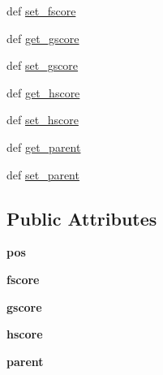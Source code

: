 \begin{DoxyCompactItemize}
\item 
def \hyperlink{classoctile__grid_1_1_octile_cell_ac76f218888c991ff5fa81ed0b4da3e01}{set\+\_\+fscore}
\item 
def \hyperlink{classoctile__grid_1_1_octile_cell_abae0db48969d455bf495159da0e2c28a}{get\+\_\+gscore}
\item 
def \hyperlink{classoctile__grid_1_1_octile_cell_a72832242286a038bda0d9fa5bdc0a3d8}{set\+\_\+gscore}
\item 
def \hyperlink{classoctile__grid_1_1_octile_cell_a80ff6a1f7058b02ffd8fa40ec55f411e}{get\+\_\+hscore}
\item 
def \hyperlink{classoctile__grid_1_1_octile_cell_a4824cc16039f8ea51496c5d844febd19}{set\+\_\+hscore}
\item 
def \hyperlink{classoctile__grid_1_1_octile_cell_a8c65a85d4226c3633698641225f5ff9e}{get\+\_\+parent}
\item 
def \hyperlink{classoctile__grid_1_1_octile_cell_a8839b31e60ae860413d607c37f4f7da4}{set\+\_\+parent}
\end{DoxyCompactItemize}
\subsection*{Public Attributes}
\begin{DoxyCompactItemize}
\item 
\hypertarget{classoctile__grid_1_1_octile_cell_a57d3eecddad6b6859b4670ed2bf60ee8}{}{\bfseries pos}\label{classoctile__grid_1_1_octile_cell_a57d3eecddad6b6859b4670ed2bf60ee8}

\item 
\hypertarget{classoctile__grid_1_1_octile_cell_a7f3b3b23d64645239d2e70bc83f401d2}{}{\bfseries fscore}\label{classoctile__grid_1_1_octile_cell_a7f3b3b23d64645239d2e70bc83f401d2}

\item 
\hypertarget{classoctile__grid_1_1_octile_cell_a0e4fe25df7d6386c732d44f516308ff1}{}{\bfseries gscore}\label{classoctile__grid_1_1_octile_cell_a0e4fe25df7d6386c732d44f516308ff1}

\item 
\hypertarget{classoctile__grid_1_1_octile_cell_a11379d3ea959e3b3fe8feb32559dd250}{}{\bfseries hscore}\label{classoctile__grid_1_1_octile_cell_a11379d3ea959e3b3fe8feb32559dd250}

\item 
\hypertarget{classoctile__grid_1_1_octile_cell_a9b6b284d7050d2a9cc002b4fbc383fc2}{}{\bfseries parent}\label{classoctile__grid_1_1_octile_cell_a9b6b284d7050d2a9cc002b4fbc383fc2}

\end{DoxyCompactItemize}


